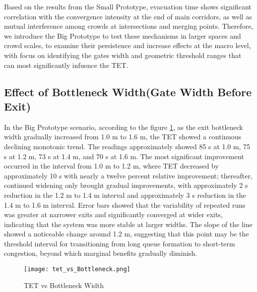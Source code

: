Based on the results from the Small Prototype, evacuation time shows significant correlation with the convergence intensity at the end of main corridors, as well as mutual interference among crowds at intersections and merging points. Therefore, we introduce the Big Prototype to test these mechanisms in larger spaces and crowd scales, to examine their persistence and increase effects at the macro level, with focus on identifying the gates width and geometric threshold ranges that can most significantly infuence the TET.

\subsection{Effect of Bottleneck Width(Gate Width Before Exit)}

In the Big Prototype scenario, according to the figure \ref{fig:tet_vs_Bottleneck}, as the exit bottleneck width gradually increased from 1.0 m to 1.6 m, the TET showed a continuous declining monotonic trend. The readings approximately showed 85 s at 1.0 m, 75 s at 1.2 m, 73 s at 1.4 m, and 70 s at 1.6 m. The most significant improvement occurred in the interval from 1.0 m to 1.2 m, where TET decreased by approximately 10 s with nearly a twelve percent relative improvement; thereafter, continued widening only brought gradual improvements, with approximately 2 s reduction in the 1.2 m to 1.4 m interval and approximately 3 s reduction in the 1.4 m to 1.6 m interval. Error bars showed that the variability of repeated runs was greater at narrower exits and significantly converged at wider exits, indicating that the system was more stable at larger widths. The slope of the line showed a noticeable change around 1.2 m, suggesting that this point may be the threshold interval for transitioning from long queue formation to short-term congestion, beyond which marginal benefits gradually diminish.

\begin{figure}[h]
    \centering
    \texttt{[image: tet\_vs\_Bottleneck.png]}
    \caption{TET vs Bottleneck Width}
    \label{fig:tet_vs_Bottleneck}
\end{figure}

